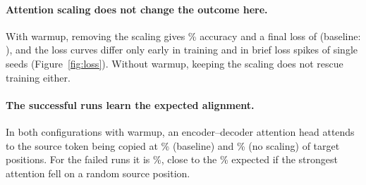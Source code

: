 \paragraph{Attention scaling does not change the outcome here.} With warmup, removing the scaling gives
\valAccNoScaling\% accuracy and a final loss of \valLossNoScaling{} (baseline: \valLossBaseline), and the loss
curves differ only early in training and in brief loss spikes of single seeds (Figure~\ref{fig:loss}). Without warmup, keeping the scaling does not rescue training either.

\paragraph{The successful runs learn the expected alignment.} In both configurations with warmup, an
encoder--decoder attention head attends to the source token being copied at \valAlignBaseline\% (baseline) and
\valAlignNoScaling\% (no scaling) of target positions. For the failed runs it is \valAlignNoWarmup\%, close to the \valChanceAlign\% expected if the
strongest attention fell on a random source position.
